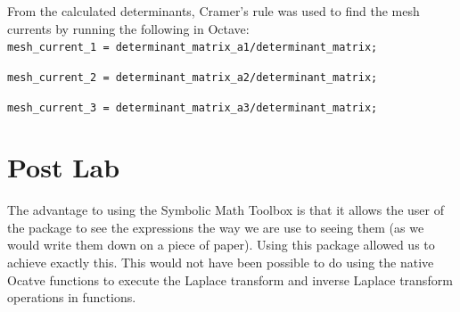 \documentclass[12pt, a4paper]{article}
\begin{document}
  	From the calculated determinants, Cramer's rule was used to find the mesh currents by running the following in Octave:\\

  	\texttt{mesh\_current\_1 =  determinant\_matrix\_a1/determinant\_matrix;}\par
	\texttt{mesh\_current\_2 =  determinant\_matrix\_a2/determinant\_matrix;}\par
	\texttt{mesh\_current\_3 =  determinant\_matrix\_a3/determinant\_matrix;}\par

	\section{Post Lab}
	The advantage to using the Symbolic Math Toolbox is that it allows the user of the package to see the expressions the way we are use to seeing them (as we would write them down on a piece of paper). Using this package allowed us to achieve exactly this. This would not have been possible to do using the native Ocatve functions to execute the Laplace transform and inverse Laplace transform operations in functions. 
\end{document}
